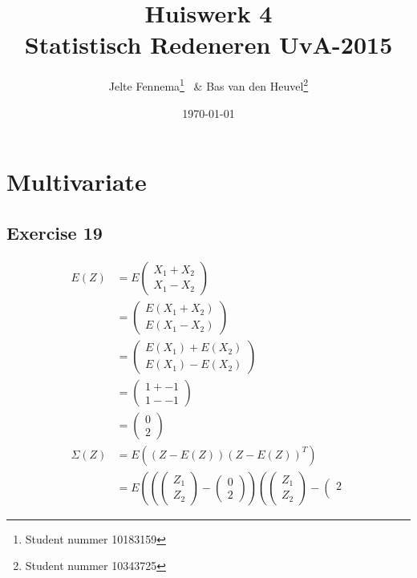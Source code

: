 \documentclass{article}
\title{Huiswerk 4\\ \large{Statistisch Redeneren UvA-2015}}
\author{Jelte Fennema\thanks{Student nummer 10183159} ~\& Bas van den
Heuvel\thanks{Student nummer 10343725}}
\date{\today}
\begin{document}
\maketitle

\section{Multivariate}

\subsection{Exercise 19}

\begin{align*}
    E(Z) &= E\left(\begin{matrix}X_1 + X_2 \\ X_1 - X_2\end{matrix}\right) \\
         &= \left(\begin{matrix}E(X_1 + X_2) \\ E(X_1 - X_2)\end{matrix}\right) \\
         &= \left(\begin{matrix}E(X_1) + E(X_2) \\ E(X_1) - E(X_2)\end{matrix}\right) \\
         &= \left(\begin{matrix}1 + -1 \\ 1 - -1\end{matrix}\right) \\
         &= \left(\begin{matrix}0 \\ 2\end{matrix}\right) \\
    \Sigma(Z) &= E\left((Z - E(Z))(Z - E(Z))^T\right) \\
              &= E\left(\left(\left(\begin{matrix}Z_1 \\ Z_2\end{matrix}\right)
              - \left(\begin{matrix}0 \\
      2\end{matrix}\right)\right)\left(\left(\begin{matrix}Z_1 \\
  Z_2\end{matrix}\right) - \left(\begin{matrix}2 \\

\end{matrix}
\end{align*}
\end{document}
